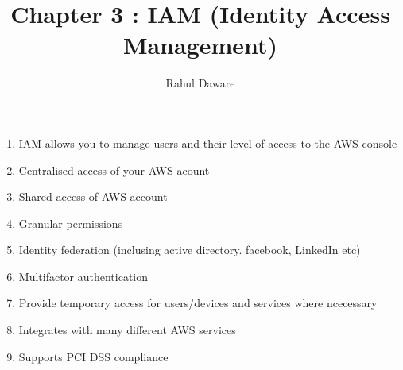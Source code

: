 \documentclass{report}
\author{Rahul Daware}
\begin{document}
    \title{Chapter 3 : IAM (Identity Access Management)}
    \maketitle
    \begin{enumerate}

    \item
 	IAM allows you to manage users and their level of access to the AWS console
 	
 	\item
 	Centralised access of your AWS acount
 	
 	\item
 	Shared access of AWS account
 	
 	\item
 	Granular permissions
 	
 	\item
 	Identity federation (inclusing active directory. facebook, LinkedIn etc)
 	
 	\item
 	Multifactor authentication
 	
 	\item
 	Provide temporary access for users/devices and services where ncecessary
 	
 	\item
 	Integrates with many different AWS services
 	
 	\item
 	Supports PCI DSS compliance
    \end{enumerate}
    
    
\end{document}
